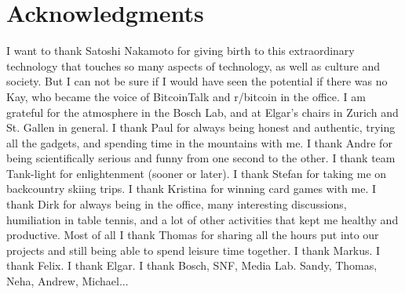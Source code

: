 
\begingroup
\let\clearpage\relax
\let\cleardoublepage\relax
\let\cleardoublepage\relax

\chapter*{Acknowledgments}

I want to thank Satoshi Nakamoto for giving birth to this extraordinary technology that touches so many aspects of technology, as well as culture and society. But I can not be sure if I would have seen the potential if there was no Kay, who became the voice of BitcoinTalk and r/bitcoin in the office. I am grateful for the atmosphere in the Bosch Lab, and at Elgar's chairs in Zurich and St. Gallen in general. I thank Paul for always being honest and authentic, trying all the gadgets, and spending time in the mountains with me. I thank Andre for being scientifically serious and funny from one second to the other. I thank team Tank-light for enlightenment (sooner or later). I thank Stefan for taking me on backcountry skiing trips. I thank Kristina for winning card games with me. I thank Dirk for always being in the office, many interesting discussions, humiliation in table tennis, and a lot of other activities that kept me healthy and productive. Most of all I thank Thomas for sharing all the hours put into our projects and still being able to spend leisure time together. I thank Markus. I thank Felix. I thank Elgar. I thank Bosch, SNF, Media Lab. Sandy, Thomas, Neha, Andrew, Michael... 


\endgroup
